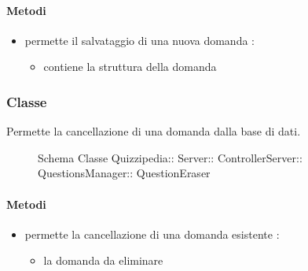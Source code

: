 \paragraph{Metodi}
\begin{itemize}
\item {}
\newline
permette il salvataggio di una nuova domanda
\newline
{} :
\begin{itemize}
\item {}
\newline
contiene la struttura della domanda
\end{itemize}
\end{itemize}
\subsubsection{Classe }
Permette la cancellazione di una domanda dalla base di dati.
\begin{figure}[H]
\centering
\noindent{}
\caption[Schema Classe QuestionEraser]{Schema Classe Quizzipedia:: Server:: ControllerServer:: QuestionsManager:: QuestionEraser}
\end{figure}
\paragraph{Metodi}
\begin{itemize}
\item {}
\newline
permette la cancellazione di una domanda esistente
\newline
{} :
\begin{itemize}
\item {}
\newline
la domanda da eliminare
\end{itemize}
\end{itemize}
